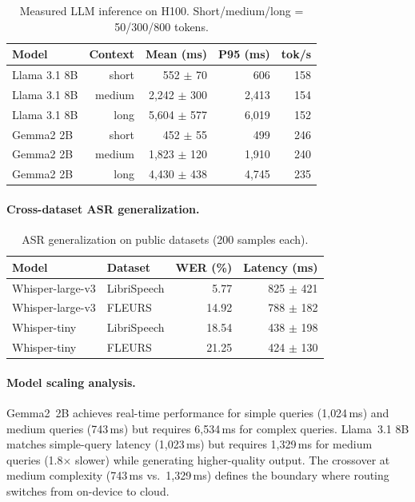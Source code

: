 \documentclass{article}
\begin{document}
\begin{table}[H]
\centering
\caption{Measured LLM inference on H100. Short/medium/long = 50/300/800 tokens.}
\label{tab:real_llm}
\small
\begin{tabular}{lrrrr}
\toprule
Model & Context & Mean (ms) & P95 (ms) & tok/s \\
\midrule
Llama 3.1 8B & short & 552 $\pm$ 70 & 606 & 158 \\
Llama 3.1 8B & medium & 2{,}242 $\pm$ 300 & 2{,}413 & 154 \\
Llama 3.1 8B & long & 5{,}604 $\pm$ 577 & 6{,}019 & 152 \\
Gemma2 2B & short & 452 $\pm$ 55 & 499 & 246 \\
Gemma2 2B & medium & 1{,}823 $\pm$ 120 & 1{,}910 & 240 \\
Gemma2 2B & long & 4{,}430 $\pm$ 438 & 4{,}745 & 235 \\
\bottomrule
\end{tabular}
\end{table}

\paragraph{Cross-dataset ASR generalization.}

\begin{table}[H]
\centering
\caption{ASR generalization on public datasets (200 samples each).}
\label{tab:cross_dataset}
\small
\begin{tabular}{llrr}
\toprule
Model & Dataset & WER (\%) & Latency (ms) \\
\midrule
Whisper-large-v3 & LibriSpeech & 5.77 & 825 $\pm$ 421 \\
Whisper-large-v3 & FLEURS & 14.92 & 788 $\pm$ 182 \\
Whisper-tiny & LibriSpeech & 18.54 & 438 $\pm$ 198 \\
Whisper-tiny & FLEURS & 21.25 & 424 $\pm$ 130 \\
\bottomrule
\end{tabular}
\end{table}

\paragraph{Model scaling analysis.} Gemma2~2B achieves real-time performance for simple queries (1{,}024\,ms) and medium queries (743\,ms) but requires 6{,}534\,ms for complex queries. Llama~3.1 8B matches simple-query latency (1{,}023\,ms) but requires 1{,}329\,ms for medium queries (1.8$\times$ slower) while generating higher-quality output. The crossover at medium complexity (743\,ms vs.\ 1{,}329\,ms) defines the boundary where routing switches from on-device to cloud.
\end{document}
